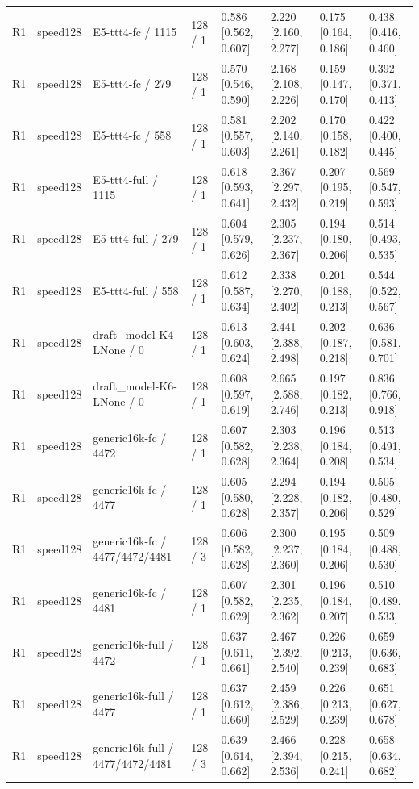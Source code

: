 \begin{tabular}{llllllll}
R1 & speed128 & E5-ttt4-fc / 1115 & 128 / 1 & 0.586 [0.562, 0.607] & 2.220 [2.160, 2.277] & 0.175 [0.164, 0.186] & 0.438 [0.416, 0.460] \\
R1 & speed128 & E5-ttt4-fc / 279 & 128 / 1 & 0.570 [0.546, 0.590] & 2.168 [2.108, 2.226] & 0.159 [0.147, 0.170] & 0.392 [0.371, 0.413] \\
R1 & speed128 & E5-ttt4-fc / 558 & 128 / 1 & 0.581 [0.557, 0.603] & 2.202 [2.140, 2.261] & 0.170 [0.158, 0.182] & 0.422 [0.400, 0.445] \\
R1 & speed128 & E5-ttt4-full / 1115 & 128 / 1 & 0.618 [0.593, 0.641] & 2.367 [2.297, 2.432] & 0.207 [0.195, 0.219] & 0.569 [0.547, 0.593] \\
R1 & speed128 & E5-ttt4-full / 279 & 128 / 1 & 0.604 [0.579, 0.626] & 2.305 [2.237, 2.367] & 0.194 [0.180, 0.206] & 0.514 [0.493, 0.535] \\
R1 & speed128 & E5-ttt4-full / 558 & 128 / 1 & 0.612 [0.587, 0.634] & 2.338 [2.270, 2.402] & 0.201 [0.188, 0.213] & 0.544 [0.522, 0.567] \\
R1 & speed128 & draft\_model-K4-LNone / 0 & 128 / 1 & 0.613 [0.603, 0.624] & 2.441 [2.388, 2.498] & 0.202 [0.187, 0.218] & 0.636 [0.581, 0.701] \\
R1 & speed128 & draft\_model-K6-LNone / 0 & 128 / 1 & 0.608 [0.597, 0.619] & 2.665 [2.588, 2.746] & 0.197 [0.182, 0.213] & 0.836 [0.766, 0.918] \\
R1 & speed128 & generic16k-fc / 4472 & 128 / 1 & 0.607 [0.582, 0.628] & 2.303 [2.238, 2.364] & 0.196 [0.184, 0.208] & 0.513 [0.491, 0.534] \\
R1 & speed128 & generic16k-fc / 4477 & 128 / 1 & 0.605 [0.580, 0.628] & 2.294 [2.228, 2.357] & 0.194 [0.182, 0.206] & 0.505 [0.480, 0.529] \\
R1 & speed128 & generic16k-fc / 4477/4472/4481 & 128 / 3 & 0.606 [0.582, 0.628] & 2.300 [2.237, 2.360] & 0.195 [0.184, 0.206] & 0.509 [0.488, 0.530] \\
R1 & speed128 & generic16k-fc / 4481 & 128 / 1 & 0.607 [0.582, 0.629] & 2.301 [2.235, 2.362] & 0.196 [0.184, 0.207] & 0.510 [0.489, 0.533] \\
R1 & speed128 & generic16k-full / 4472 & 128 / 1 & 0.637 [0.611, 0.661] & 2.467 [2.392, 2.540] & 0.226 [0.213, 0.239] & 0.659 [0.636, 0.683] \\
R1 & speed128 & generic16k-full / 4477 & 128 / 1 & 0.637 [0.612, 0.660] & 2.459 [2.386, 2.529] & 0.226 [0.213, 0.239] & 0.651 [0.627, 0.678] \\
R1 & speed128 & generic16k-full / 4477/4472/4481 & 128 / 3 & 0.639 [0.614, 0.662] & 2.466 [2.394, 2.536] & 0.228 [0.215, 0.241] & 0.658 [0.634, 0.682] \\

\end{tabular}
